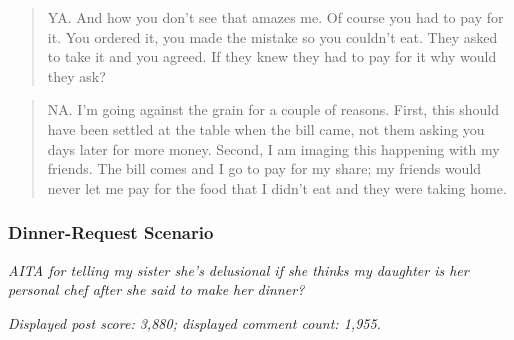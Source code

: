 
\begin{quote}
YA. And how you don't see that amazes me. Of course you had to pay for
it. You ordered it, you made the mistake so you couldn't eat. They
asked to take it and you agreed. If they knew they had to pay for it
why would they ask?
\end{quote}


\begin{quote}
NA. I'm going against the grain for a couple of reasons. First, this
should have been settled at the table when the bill came, not them
asking you days later for more money. Second, I am imaging this
happening with my friends. The bill comes and I go to pay for my share;
my friends would never let me pay for the food that I didn't eat and
they were taking home.
\end{quote}


\subsubsection{Dinner-Request Scenario}
\label{app:stimulus-zlh4jp}

\textit{AITA for telling my sister she's delusional if she thinks my
daughter is her personal chef after she said to make her dinner?}

\noindent\textit{Displayed post score: 3,880; displayed comment count:
1,955.}


